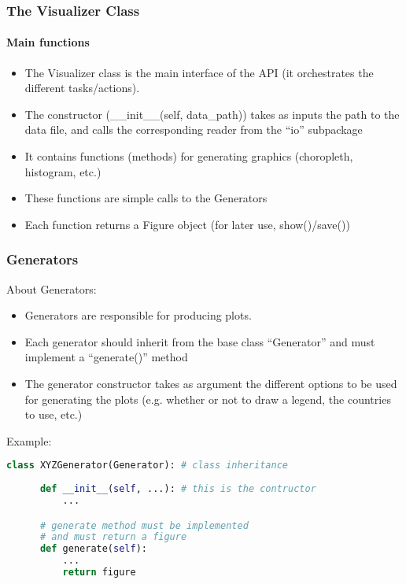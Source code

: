 \begin{frame}
  \frametitle{The Visualizer Class}
  \framesubtitle{Main functions}

  \begin{itemize}
    \item The Visualizer class is the main interface of the API (it orchestrates the different tasks/actions).
    \item The constructor (\_\_init\_\_(self, data\_path)) takes as inputs 
      the path to the data file, and calls the corresponding reader from the ``io'' subpackage
    \item It contains functions (methods) for generating graphics (choropleth, histogram, etc.)
    \item These functions are simple calls to the Generators
    \item Each function returns a Figure object (for later use, show()/save())
  \end{itemize}

\end{frame}

\begin{frame}[fragile,shrink=30]
  \frametitle{Generators}

  About Generators:
  \begin{itemize}
    \item Generators are responsible for producing plots.
    \item Each generator should inherit from the base class 
      ``Generator'' and must implement a ``generate()'' method
    \item The generator constructor takes as argument the different options 
      to be used for generating the plots 
      (e.g. whether or not to draw a legend, the countries to use, etc.)
  \end{itemize}

  \vspace{5mm}

  Example:
  \begin{lstlisting}[language=Python]
  class XYZGenerator(Generator): # class inheritance
      
      def __init__(self, ...): # this is the contructor
          ...

      # generate method must be implemented 
      # and must return a figure
      def generate(self): 
          ...
          return figure
  \end{lstlisting}
\end{frame}

